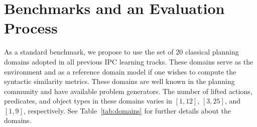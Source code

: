 \documentclass[letterpaper]{article} %
\newif\ifaddcomments
\newcommand{\todo}[1]{\ifaddcomments{\textcolor{red}{[TODO: #1]}}\fi}
\newcommand{\roni}[1]{\ifaddcomments{\textcolor{red}{[Roni: #1]}}\fi}
\newcommand{\leo}[1]{\ifaddcomments{\textcolor{pink}{[Leonardo: #1]}}\fi}
\begin{document}
\section{Benchmarks and an Evaluation Process}






%
As a standard benchmark, we propose to use the set of $20$ classical planning domains adopted in all previous IPC learning tracks. %
These domains serve as the environment and as a reference domain model if one wishes to compute the syntactic similarity metrics. 
These domains are well known in the planning community and have available problem generators. %
The number of lifted actions, predicates, and object types in these domains varies in 
$[1, 12]$, $[3,25]$, and $[1, 9]$, respectively.
See Table~\ref{tab:domains} for further details about the domains. %
\end{document}
